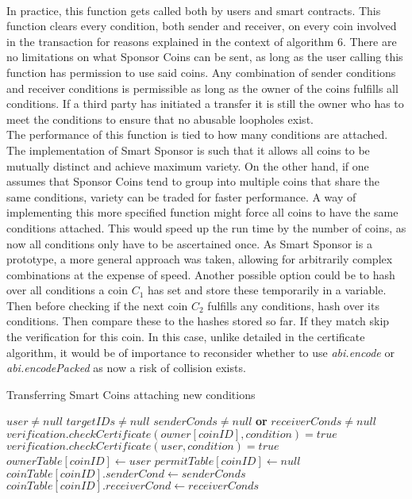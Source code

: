 \\
In practice, this function gets called both by users and smart contracts. This function clears every condition, both sender and receiver, on every coin involved in the transaction for reasons explained in the context of algorithm 6. There are no limitations on what Sponsor Coins can be sent, as long as the user calling this function has permission to use said coins. Any combination of sender conditions and receiver conditions is permissible as long as the owner of the coins fulfills all conditions. If a third party has initiated a transfer it is still the owner who has to meet the conditions to ensure that no abusable loopholes exist.\\
The performance of this function is tied to how many conditions are attached. The implementation of Smart Sponsor is such that it allows all coins to be mutually distinct and achieve maximum variety. On the other hand, if one assumes that Sponsor Coins tend to group into multiple coins that share the same conditions, variety can be traded for faster performance. A way of implementing this more specified function might force all coins to have the same conditions attached. This would speed up the run time by the number of coins, as now all conditions only have to be ascertained once. As Smart Sponsor is a prototype, a more general approach was taken, allowing for arbitrarily complex combinations at the expense of speed. Another possible option could be to hash over all conditions a coin $C_1$ has set and store these temporarily in a variable. Then before checking if the next coin $C_2$ fulfills any conditions, hash over its conditions. Then compare these to the hashes stored so far. If they match skip the verification for this coin. In this case, unlike detailed in the certificate algorithm, it would be of importance to reconsider whether to use \emph{abi.encode} or \emph{abi.encodePacked} as now a risk of collision exists.\\
\begin{algorithm}
\caption{Transferring Smart Coins attaching new conditions}\label{alg:attach}
\begin{algorithmic}[1]
\Require $user \neq null$
\Require $targetIDs \neq null$
\Require $senderConds \neq null $ \textbf{or} $receiverConds \neq null$
\Ensure $verification.checkCertificate(owner[coinID], condition) = true$
\EndFor
{}
\Ensure $verification.checkCertificate(user, condition) = true$
\EndFor
\State $ownerTable[coinID] \gets user$
\State $permitTable[coinID] \gets null$
\State $coinTable[coinID].senderCond \gets senderConds$
\State $coinTable[coinID].receiverCond \gets receiverConds$
\EndIf
\EndFor
\end{algorithmic}
\end{algorithm}
